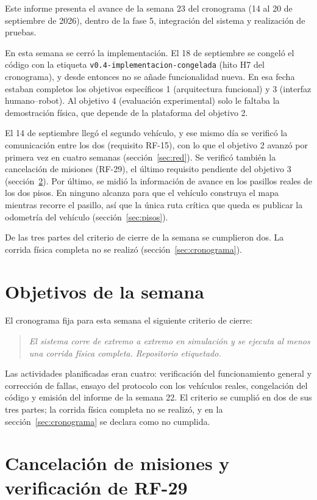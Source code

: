 \documentclass[12pt,letterpaper]{article}
\begin{document}
Este informe presenta el avance de la semana 23 del cronograma (14 al 20 de septiembre de 2026), dentro de la fase 5, integración del sistema y realización de pruebas.

En esta semana se cerró la implementación. El 18 de septiembre se congeló el código con la etiqueta \texttt{v0.4-implementacion-congelada} (hito H7 del cronograma), y desde entonces no se añade funcionalidad nueva. En esa fecha estaban completos los objetivos específicos 1 (arquitectura funcional) y 3 (interfaz humano--robot). Al objetivo 4 (evaluación experimental) solo le faltaba la demostración física, que depende de la plataforma del objetivo 2.

El 14 de septiembre llegó el segundo vehículo, y ese mismo día se verificó la comunicación entre los dos (requisito RF-15), con lo que el objetivo 2 avanzó por primera vez en cuatro semanas (sección~\ref{sec:red}). Se verificó también la cancelación de misiones (RF-29), el último requisito pendiente del objetivo 3 (sección~\ref{sec:rf29}). Por último, se midió la información de avance en los pasillos reales de los dos pisos. En ninguno alcanza para que el vehículo construya el mapa mientras recorre el pasillo, así que la única ruta crítica que queda es publicar la odometría del vehículo (sección~\ref{sec:pisos}).

De las tres partes del criterio de cierre de la semana se cumplieron dos. La corrida física completa no se realizó (sección~\ref{sec:cronograma}).

\section{Objetivos de la semana}

El cronograma fija para esta semana el siguiente criterio de cierre:

\begin{quote}
\textit{El sistema corre de extremo a extremo en simulación y se ejecuta al menos una corrida física completa. Repositorio etiquetado.}
\end{quote}

Las actividades planificadas eran cuatro: verificación del funcionamiento general y corrección de fallas, ensayo del protocolo con los vehículos reales, congelación del código y emisión del informe de la semana 22. El criterio se cumplió en dos de sus tres partes; la corrida física completa no se realizó, y en la sección~\ref{sec:cronograma} se declara como no cumplida.

\section{Cancelación de misiones y verificación de RF-29}
\label{sec:rf29}
\end{document}
